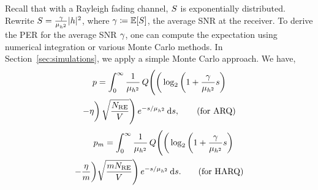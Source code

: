 Recall that with a Rayleigh fading channel,  ${S}$ is exponentially distributed. Rewrite $S = \frac{\gamma}{{\mu_{h^2}} }\vert h\vert^2$, where $\gamma \coloneqq \mathbb{E}[S]$, the average SNR at the receiver. To derive the PER for the average SNR $\gamma$, one can compute the expectation using numerical integration or various Monte Carlo methods. In Section~\ref{sec:simulations}, we apply a simple Monte Carlo approach. We have,
\begin{multline}
    p=\int_{0}^{\infty}\frac{1}{{\mu_{h^2}} }\,Q\Bigg(\bigg(\log_2\bigg(1+\frac{\gamma}{{\mu_{h^2}} }s\bigg)\\
    -\eta\bigg)\,\sqrt{\frac{N_{\mathrm{RE}}}{V}}\Bigg)\,e^{{-s}/{{\mu_{h^2}}}}\,\mathrm{d}s,\qquad\text{(for ARQ)}\label{eq:secModel_perARQ}
\end{multline}
\begin{multline}
    \quad p_m=\int_{0}^{\infty}\frac{1}{{\mu_{h^2}} }\,
    Q\Bigg(\bigg(\log_2\bigg(1+\frac{\gamma}{{\mu_{h^2}} }s\bigg)\\
    -\frac{\eta}{m}\bigg)\sqrt{\frac{mN_{\mathrm{RE}}}{V}}\Bigg)\,e^{{-s}/{{\mu_{h^2}} }}\,\mathrm{d}s.\qquad\text{(for HARQ)}\label{eq:secModel_perHARQ}
\end{multline}

